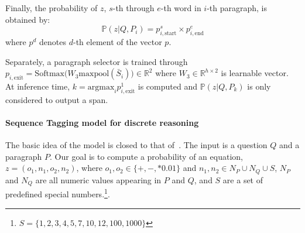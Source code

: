 \documentclass[11pt,a4paper]{article}
\begin{document}
Finally, the probability of $z$, $s$-th through $e$-th word in $i$-th paragraph, is obtained by:
\begin{equation*}
    \mathbb{P}(z|Q, P_i) = p_{i,\textrm{start}}^s \times p_{i,\textrm{end}}^e
\end{equation*}
where $p^d$ denotes $d$-th element of the vector $p$.

Separately, a paragraph selector is trained through $p_{i,\textrm{exit}} = \mathrm{Softmax} \big( W_3 \mathrm{maxpool}(\bar{S}_i) \big) \in \mathbb{R}^2$ where $W_3 \in \mathbb{R}^{h \times 2}$ is learnable vector. At inference time, $k = \mathrm{argmax}_i p_{i,\textrm{exit}}^1$ is computed and $\mathbb{P}(z|Q, P_k)$ is only considered to output a span.




\paragraph{Sequence Tagging model for discrete reasoning}
The basic idea of the model is closed to that of~\citet{drop}.
The input is a question $Q$ and a paragraph $P$. Our goal is to compute a probability of an equation, $z = (o_1, n_1, o_2, n_2)$, where $ o_1, o_2 \in \{ +, -, *0.01 \}$ and $n_1, n_2 \in N_P \cup N_Q \cup S$, $N_P$ and $N_Q$ are all numeric values appearing in $P$ and $Q$, and $S$ are a set of predefined special numbers.\footnote{$S=\{1,2,3,4,5,7,10,12,100,1000\}$}.
\end{document}
